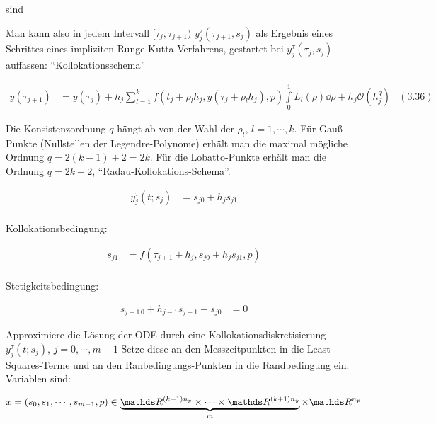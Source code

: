 sind

Man kann also in jedem Intervall $[\tau_j,\tau_{j+1})$ $y_j^\tau(\tau_{j+1}, s_j)$ als Ergebnis eines Schrittes eines impliziten Runge-Kutta-Verfahrens, gestartet bei $y_j^\tau (\tau_j, s_j)$ auffassen: "`Kollokationsschema"'


\begin{align*}
y(\tau_{j+1}) &= y(\tau_j) + h_j \sum\limits_{l=1}^k f(t_j + \rho_l h_j, y(\tau_j + \rho_l h_j), p) \int\limits_0^1 L_l(\rho) \dd \rho + h_j \mathcal O(h_j^q) & (3.36)
\end{align*}

Die Konsistenzordnung $q$ hängt ab von der Wahl der $\rho_l$, $l=1,\cdots,k$. Für Gauß-Punkte (Nullstellen der Legendre-Polynome) erhält man die maximal mögliche Ordnung $q=2(k-1)+2 = 2k$. Für die Lobatto-Punkte erhält man die Ordnung $q=2k-2$, "`Radau-Kollokations-Schema"'.


\begin{align*}
y_j^\tau (t;s_j) &= s_{j0} + h_j s_{j1} \\
\end{align*}


Kollokationsbedingung:

\begin{align*}
s_{j1} &= f(\tau_{j+1} + h_j, s_{j0} + h_j s_{j1}, p) \\
\end{align*}

Stetigkeitsbedingung:

\begin{align*}
s_{j-1\,0} + h_{j-1}s_{j-1} - s_{j0} &= 0 
\end{align*}


Approximiere die Lösung der ODE durch eine Kollokationsdiskretisierung $y_j^\tau (t; s_j)$, $j=0,\cdots,m-1$ Setze diese an den Messzeitpunkten in die Least-Squares-Terme und an den Ranbedingungs-Punkten in die Randbedingung ein. Variablen sind:

\begin{align*}
x &= (s_0,s_1,\cdots,s_{m-1},p) \in \underbrace{ \R^{(k+1)n_y} \times \cdots \times \R^{(k+1)n_y}}_{m} \times \R^{n_p} \\
\end{align*}

